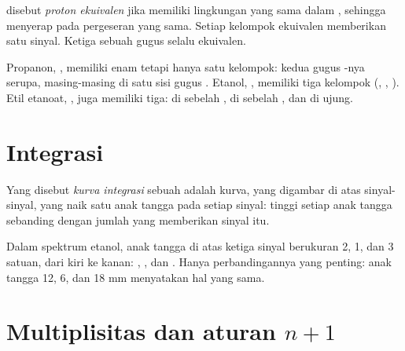 \begin{definition}\label{def:g12:proton-nmr:equivalent}
 disebut \emph{proton ekuivalen}
jika memiliki lingkungan yang sama dalam , sehingga menyerap pada
pergeseran yang sama. Setiap kelompok  ekuivalen memberikan satu
sinyal. Ketiga  sebuah gugus  selalu ekuivalen.
\end{definition}

\begin{example}\label{ex:g12:proton-nmr:groups}
Propanon, , memiliki enam  tetapi hanya satu
kelompok: kedua gugus -nya serupa, masing-masing di satu sisi
gugus . Etanol, , memiliki tiga kelompok (,
, ). Etil etanoat, , juga memiliki
tiga:
 di sebelah ,  di sebelah , dan 
di ujung.
\end{example}

\section{Integrasi}

\begin{definition}\label{def:g12:proton-nmr:integration}
Yang disebut \emph{kurva integrasi} sebuah
 adalah kurva, yang digambar di atas sinyal-sinyal, yang
naik satu anak tangga pada setiap sinyal: tinggi setiap anak tangga
sebanding dengan jumlah  yang memberikan sinyal itu.
\end{definition}

\begin{example}\label{ex:g12:proton-nmr:steps}
Dalam spektrum etanol, anak tangga di atas ketiga sinyal berukuran 2, 1,
dan 3 satuan, dari kiri ke kanan: , , dan . Hanya
perbandingannya yang penting: anak tangga 12, 6, dan 18 mm menyatakan
hal yang sama.
\end{example}

\section{Multiplisitas dan aturan \texorpdfstring{$n+1$}{n+1}}


